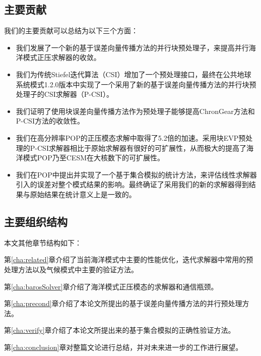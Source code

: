 \subsection{主要贡献}
我们的主要贡献可以总结为以下三个方面：
\begin{itemize}
\item  
我们发展了一个新的基于误差向量传播方法的并行块预处理子\cite{roache1995elliptic}，来提高并行海洋模式正压求解器的收敛。 
\item  
我们为传统Stiefel迭代算法（CSI）\cite{hu2013scalable}增加了一个预处理接口，最终在公共地球系统模式1.2.0版本中实现了一个采用了新的基于误差向量传播方法的并行块预处理子的CSI求解器（P-CSI）。
\item  
我们证明了使用块误差向量传播方法作为预处理子能够提高ChronGear方法和P-CSI方法的收敛性。 
\item  
我们在高分辨率POP的正压模态求解中取得了5.2倍的加速。采用块EVP预处理的P-CSI求解器相比于原始求解器有很好的可扩展性，从而极大的提高了海洋模式POP乃至CESM在大核数下的可扩展性。 
\item  
我们在POP中提出并实现了一个基于集合模拟的统计方法，来评估线性求解器引入的误差对整个模式结果的影响。最终确证了采用我们的新的求解器得到结果与原始结果在统计意义上是一致的。 
\end{itemize}
\subsection{主要组织结构}
本文其他章节结构如下：

第\ref{cha:related}章介绍了当前海洋模式中主要的性能优化，迭代求解器中常用的预处理方法以及气候模式中主要的验证方法。

第\ref{cha:barosSolver}章介绍了海洋模式正压模态的求解器和通信瓶颈。

第\ref{cha:precond}章介绍了本论文所提出的基于误差向量传播方法的并行预处理方法。

第\ref{cha:verify}章介绍了本论文所提出来的基于集合模拟的正确性验证方法。 

第\ref{cha:conclusion}章对整篇文论进行总结，并对未来进一步的工作进行展望。


